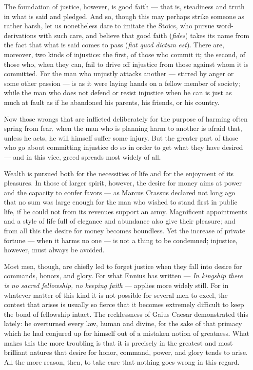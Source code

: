  The foundation of justice, however, is good faith — that is, steadiness and truth in what is said and pledged. And so, though this may perhaps strike someone as rather harsh, let us nonetheless dare to imitate the Stoics, who pursue word-derivations with such care, and believe that good faith (\textit{fides}) takes its name from the fact that what is said comes to pass (\textit{fiat quod dictum est}). There are, moreover, two kinds of injustice: the first, of those who commit it; the second, of those who, when they can, fail to drive off injustice from those against whom it is committed. For the man who unjustly attacks another — stirred by anger or some other passion — is as it were laying hands on a fellow member of society; while the man who does not defend or resist injustice when he can is just as much at fault as if he abandoned his parents, his friends, or his country.

 Now those wrongs that are inflicted deliberately for the purpose of harming often spring from fear, when the man who is planning harm to another is afraid that, unless he acts, he will himself suffer some injury. But the greater part of those who go about committing injustice do so in order to get what they have desired — and in this vice, greed spreads most widely of all.

 Wealth is pursued both for the necessities of life and for the enjoyment of its pleasures. In those of larger spirit, however, the desire for money aims at power and the capacity to confer favors — as Marcus Crassus declared not long ago that no sum was large enough for the man who wished to stand first in public life, if he could not from its revenues support an army. Magnificent appointments and a style of life full of elegance and abundance also give their pleasure; and from all this the desire for money becomes boundless. Yet the increase of private fortune — when it harms no one — is not a thing to be condemned; injustice, however, must always be avoided.

 Most men, though, are chiefly led to forget justice when they fall into desire for commands, honors, and glory. For what Ennius has written — \textit{In kingship there is no sacred fellowship, no keeping faith} — applies more widely still. For in whatever matter of this kind it is not possible for several men to excel, the contest that arises is usually so fierce that it becomes extremely difficult to keep the bond of fellowship intact. The recklessness of Gaius Caesar demonstrated this lately: he overturned every law, human and divine, for the sake of that primacy which he had conjured up for himself out of a mistaken notion of greatness. What makes this the more troubling is that it is precisely in the greatest and most brilliant natures that desire for honor, command, power, and glory tends to arise. All the more reason, then, to take care that nothing goes wrong in this regard.


